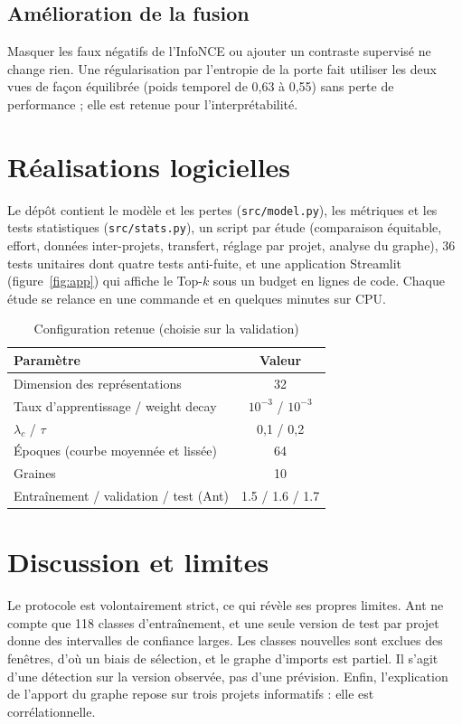 \documentclass[conference,a4paper]{IEEEtran}
\newcommand{\sect}[1]{\section{\textcolor{ieeeblue}{#1}}}
\newcommand{\subsect}[1]{\subsection{\textcolor{ieeeblue}{#1}}}
\newcommand{\code}[1]{\texttt{#1}}
\begin{document}
\subsect{Amélioration de la fusion}
Masquer les faux négatifs de l'InfoNCE ou ajouter un contraste supervisé ne change rien. Une régularisation par
l'entropie de la porte fait utiliser les deux vues de façon équilibrée (poids temporel de 0,63 à 0,55) sans perte de
performance ; elle est retenue pour l'interprétabilité.

\sect{Réalisations logicielles}
Le dépôt contient le modèle et les pertes (\code{src/model.py}), les métriques et les tests statistiques
(\code{src/stats.py}), un script par étude (comparaison équitable, effort, données inter-projets, transfert, réglage
par projet, analyse du graphe), 36 tests unitaires dont quatre tests anti-fuite, et une application Streamlit
(figure~\ref{fig:app}) qui affiche le Top-$k$ sous un budget en lignes de code. Chaque étude se relance en une commande
et en quelques minutes sur CPU.

\begin{table}[t]
\centering
\caption{Configuration retenue (choisie sur la validation)}
\label{tab:config}
\footnotesize
\begin{tabular}{@{}lc@{}}
\toprule
Paramètre & Valeur \\
\midrule
Dimension des représentations & 32 \\
Taux d'apprentissage / weight decay & $10^{-3}$ / $10^{-3}$ \\
$\lambda_c$ / $\tau$ & 0,1 / 0,2 \\
Époques (courbe moyennée et lissée) & 64 \\
Graines & 10 \\
Entraînement / validation / test (Ant) & 1.5 / 1.6 / 1.7 \\
\bottomrule
\end{tabular}
\end{table}

\sect{Discussion et limites}
Le protocole est volontairement strict, ce qui révèle ses propres limites. Ant ne compte que 118 classes
d'entraînement, et une seule version de test par projet donne des intervalles de confiance larges. Les classes nouvelles
sont exclues des fenêtres, d'où un biais de sélection, et le graphe d'imports est partiel. Il s'agit d'une détection sur
la version observée, pas d'une prévision. Enfin, l'explication de l'apport du graphe repose sur trois projets
informatifs : elle est corrélationnelle.
\end{document}

